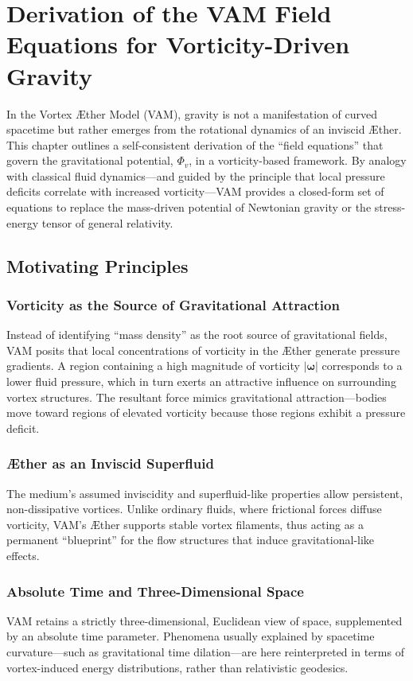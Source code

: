 \section{Derivation of the VAM Field Equations for Vorticity-Driven Gravity}
In the Vortex Æther Model (VAM), gravity is not a manifestation of curved spacetime but rather emerges from the rotational dynamics of an inviscid Æther. This chapter outlines a self-consistent derivation of the “field equations” that govern the gravitational potential, \(\Phi_v\), in a vorticity-based framework. By analogy with classical fluid dynamics—and guided by the principle that local pressure deficits correlate with increased vorticity—VAM provides a closed-form set of equations to replace the mass-driven potential of Newtonian gravity or the stress-energy tensor of general relativity.

\subsection{Motivating Principles}
\subsubsection{Vorticity as the Source of Gravitational Attraction}
Instead of identifying “mass density” as the root source of gravitational fields, VAM posits that local concentrations of vorticity in the Æther generate pressure gradients. A region containing a high magnitude of vorticity \(\lvert \boldsymbol{\omega} \rvert\) corresponds to a lower fluid pressure, which in turn exerts an attractive influence on surrounding vortex structures. The resultant force mimics gravitational attraction—bodies move toward regions of elevated vorticity because those regions exhibit a pressure deficit.

\subsubsection{Æther as an Inviscid Superfluid}
The medium’s assumed inviscidity and superfluid-like properties allow persistent, non-dissipative vortices. Unlike ordinary fluids, where frictional forces diffuse vorticity, VAM’s Æther supports stable vortex filaments, thus acting as a permanent “blueprint” for the flow structures that induce gravitational-like effects.

\subsubsection{Absolute Time and Three-Dimensional Space}
VAM retains a strictly three-dimensional, Euclidean view of space, supplemented by an absolute time parameter. Phenomena usually explained by spacetime curvature—such as gravitational time dilation—are here reinterpreted in terms of vortex-induced energy distributions, rather than relativistic geodesics.


